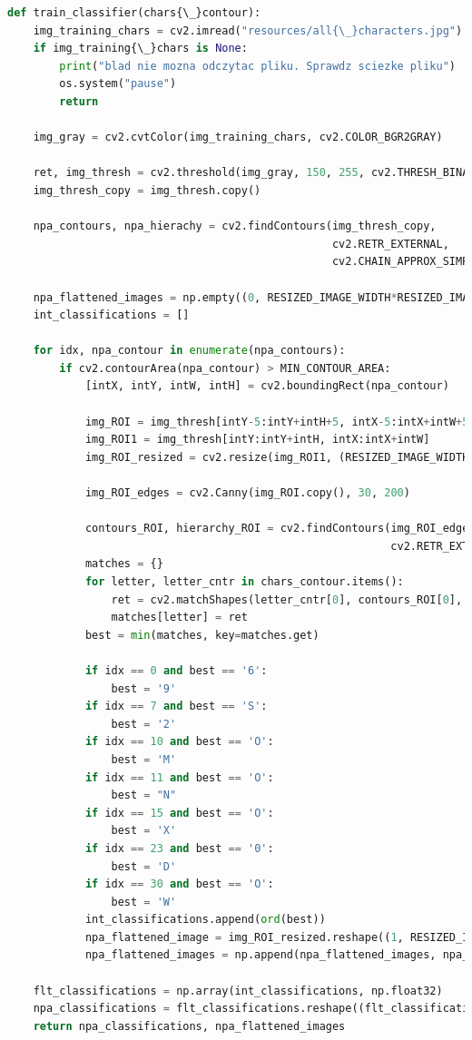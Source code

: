 \documentclass[12pt,a4paper,oneside]{article}
\theoremstyle{definition}
\numberwithin{equation}{section}
\begin{document}
\begin{lstlisting}[language=Python]
def train_classifier(chars{\_}contour):
    img_training_chars = cv2.imread("resources/all{\_}characters.jpg")
    if img_training{\_}chars is None:
        print("blad nie mozna odczytac pliku. Sprawdz sciezke pliku")
        os.system("pause")
        return

    img_gray = cv2.cvtColor(img_training_chars, cv2.COLOR_BGR2GRAY)

    ret, img_thresh = cv2.threshold(img_gray, 150, 255, cv2.THRESH_BINARY_INV)
    img_thresh_copy = img_thresh.copy()

    npa_contours, npa_hierachy = cv2.findContours(img_thresh_copy,
                                                  cv2.RETR_EXTERNAL,
                                                  cv2.CHAIN_APPROX_SIMPLE)

    npa_flattened_images = np.empty((0, RESIZED_IMAGE_WIDTH*RESIZED_IMAGE_HEIGHT))
    int_classifications = []

    for idx, npa_contour in enumerate(npa_contours):
        if cv2.contourArea(npa_contour) > MIN_CONTOUR_AREA:
            [intX, intY, intW, intH] = cv2.boundingRect(npa_contour)

            img_ROI = img_thresh[intY-5:intY+intH+5, intX-5:intX+intW+5]
            img_ROI1 = img_thresh[intY:intY+intH, intX:intX+intW]
            img_ROI_resized = cv2.resize(img_ROI1, (RESIZED_IMAGE_WIDTH, RESIZED_IMAGE_HEIGHT))

            img_ROI_edges = cv2.Canny(img_ROI.copy(), 30, 200)

            contours_ROI, hierarchy_ROI = cv2.findContours(img_ROI_edges.copy(),
                                                           cv2.RETR_EXTERNAL, cv2.CHAIN_APPROX_NONE)
            matches = {}
            for letter, letter_cntr in chars_contour.items():
                ret = cv2.matchShapes(letter_cntr[0], contours_ROI[0], 1, 0.0)
                matches[letter] = ret
            best = min(matches, key=matches.get)
            
            if idx == 0 and best == '6':
                best = '9'
            if idx == 7 and best == 'S':
                best = '2'
            if idx == 10 and best == 'O':
                best = 'M'
            if idx == 11 and best == 'O':
                best = "N"
            if idx == 15 and best == 'O':
                best = 'X'
            if idx == 23 and best == '0':
                best = 'D'
            if idx == 30 and best == 'O':
                best = 'W'
            int_classifications.append(ord(best))
            npa_flattened_image = img_ROI_resized.reshape((1, RESIZED_IMAGE_WIDTH * RESIZED_IMAGE_HEIGHT))
            npa_flattened_images = np.append(npa_flattened_images, npa_flattened_image, 0)

    flt_classifications = np.array(int_classifications, np.float32)
    npa_classifications = flt_classifications.reshape((flt_classifications.size, 1))
    return npa_classifications, npa_flattened_images
\end{lstlisting} 
\end{document}
